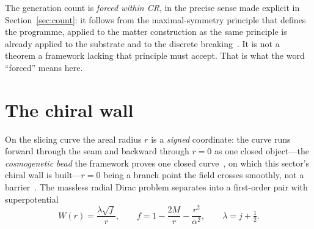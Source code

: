 \documentclass[11pt]{article}
\begin{document}
The generation count is \emph{forced within CR}, in the precise sense made explicit in Section~\ref{sec:count}: it follows from the maximal-symmetry principle that defines the programme, applied to the matter construction as the same principle is already applied to the substrate and to the discrete breaking~\cite{JanzenGeometricCore}. It is not a theorem a framework lacking that principle must accept. That is what the word ``forced'' means here.

\section{The chiral wall}\label{sec:chirality}

On the slicing curve the areal radius $r$ is a \emph{signed} coordinate: the curve runs forward through the seam and backward through $r=0$ as one closed object---the \emph{cosmogenetic bead} the framework proves one closed curve~\cite{JanzenCRframework}, on which this sector's chiral wall is built---$r=0$ being a branch point the field crosses smoothly, not a barrier~\cite{JanzenSlicing,JanzenCircle}. The massless radial Dirac problem separates into a first-order pair with superpotential
\begin{equation}
W(r)=\frac{\lambda\sqrt{f}}{r},\qquad f=1-\frac{2M}{r}-\frac{r^2}{\alpha^2},\qquad \lambda=j+\tfrac12 .
\end{equation}
\end{document}
